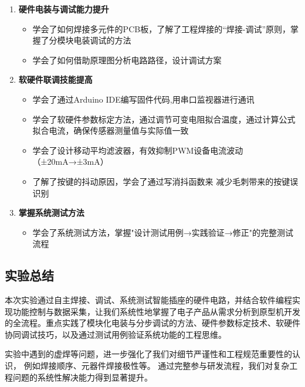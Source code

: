 \documentclass[10.5pt]{config}
\begin{document}
\begin{enumerate}
\item \textbf{硬件电装与调试能力提升}
\begin{itemize}
\item 学会了如何焊接多元件的PCB板，了解了工程焊接的“焊接-调试”原则，掌握了分模块电装调试的方法
\item 学会了如何借助原理图分析电路路径，设计调试方案
\end{itemize}

\item \textbf{软硬件联调技能提高}
\begin{itemize}
\item 学会了通过Arduino IDE编写固件代码,用串口监视器进行通讯
\item 学会了软硬件参数标定方法，通过调节可变电阻拟合温度，通过计算公式拟合电流，确保传感器测量值与实际值一致
\item 学会了设计移动平均滤波器，有效抑制PWM设备电流波动（±20mA→±3mA）
\item 了解了按键的抖动原因，学会了通过写消抖函数来 减少毛刺带来的按键误识别
\end{itemize}

\item \textbf{掌握系统测试方法}
\begin{itemize}
\item 学会了系统测试方法，掌握"设计测试用例→实践验证→修正"的完整测试流程
\end{itemize}

\end{enumerate}

\subsection{实验总结}
本次实验通过自主焊接、调试、系统测试智能插座的硬件电路，并结合软件编程实现功能控制与数据采集，让我们系统性地掌握了电子产品从需求分析到原型机开发的全流程。重点实践了模块化电装与分步调试的方法、硬件参数标定技术、软硬件协同调试技巧，以及通过测试用例验证系统功能的工程思维。

实验中遇到的虚焊等问题，进一步强化了我们对细节严谨性和工程规范重要性的认识，
例如焊接顺序、元器件焊接极性等。
通过完整参与研发流程，我们对复杂工程问题的系统性解决能力得到显著提升。
\end{document}
